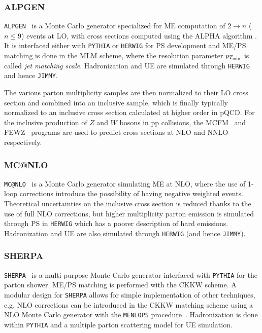 \subsubsection*{ALPGEN}

\texttt{ALPGEN}~\cite{ALPGEN} is a Monte Carlo generator specialized for
ME computation of $2 \to n$ ($n\leq 9$) events at LO, with cross sections 
computed using the ALPHA algorithm \cite{ALPGEN_0}. It is interfaced either
with \texttt{PYTHIA} or \texttt{HERWIG} for PS development and ME/PS matching
is done in the MLM scheme, where the resolution parameter $p_{T_{\rm min}}$ is
called {\it jet matching scale}.
Hadronization and UE are simulated through \texttt{HERWIG}
and hence \texttt{JIMMY}.

The various parton multiplicity samples are then normalized to their LO cross section
and combined into an inclusive sample, which is finally typically normalized 
to an inclusive cross section calculated at higher order in pQCD. 
For the inclusive production of $Z$ and $W$ bosons in pp collisions, the 
MCFM~\cite{MCFM} and FEWZ~\cite{Gavin:2010az} programs are used to predict 
cross sections at NLO and NNLO respectively.


\subsubsection*{MC@NLO}

\texttt{MC@NLO}~\cite{mcatnlo} is a Monte Carlo generator simulating ME at
NLO, where the use of 1-loop corrections introduce the possibility of having
negative weighted events. Theoretical uncertainties on the inclusive cross
section is reduced thanks to the use of full NLO corrections, but higher multiplicity
parton emission is simulated through PS in \texttt{HERWIG} which has
a poorer description of hard emissions. 
Hadronization and UE are also simulated through \texttt{HERWIG}
(and hence \texttt{JIMMY}).

\subsubsection*{SHERPA}

\texttt{SHERPA}~\cite{sherpa} is a multi-purpose Monte Carlo generator
interfaced with \texttt{PYTHIA} for the parton shower. ME/PS matching
is performed with the CKKW scheme.
A modular design for \texttt{SHERPA} allows for  simple implementation
of other techniques, e.g. NLO corrections can be introduced in the
CKKW matching scheme using a NLO Monte Carlo generator with the
\texttt{MENLOPS} procedure~\cite{MENLOPS}.
Hadronization is done within \texttt{PYTHIA} and a multiple parton 
scattering model for UE simulation.


